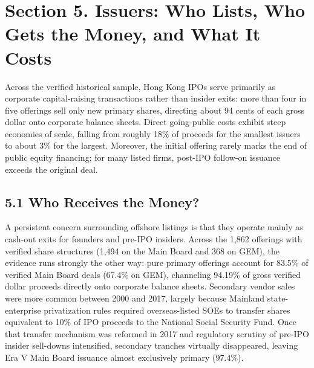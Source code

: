 \documentclass[11pt,letterpaper]{article}
\begin{document}
\section*{\texorpdfstring{Section 5. Issuers: Who Lists, Who Gets the Money, and What It Costs}{Section 5. Issuers: Who Lists, Who Gets the Money, and What It Costs}}
Across the verified historical sample, Hong Kong IPOs serve primarily as corporate capital-raising transactions rather than insider exits: more than four in five offerings sell only new primary shares, directing about 94 cents of each gross dollar onto corporate balance sheets. Direct going-public costs exhibit steep economies of scale, falling from roughly 18\% of proceeds for the smallest issuers to about 3\% for the largest. Moreover, the initial offering rarely marks the end of public equity financing; for many listed firms, post-IPO follow-on issuance exceeds the original deal.

\subsection*{\texorpdfstring{5.1 Who Receives the Money?}{5.1 Who Receives the Money?}}
A persistent concern surrounding offshore listings is that they operate mainly as cash-out exits for founders and pre-IPO insiders. Across the 1,862 offerings with verified share structures (1,494 on the Main Board and 368 on GEM), the evidence runs strongly the other way: pure primary offerings account for 83.5\% of verified Main Board deals (67.4\% on GEM), channeling 94.19\% of gross verified dollar proceeds directly onto corporate balance sheets. Secondary vendor sales were more common between 2000 and 2017, largely because Mainland state-enterprise privatization rules required overseas-listed SOEs to transfer shares equivalent to 10\% of IPO proceeds to the National Social Security Fund. Once that transfer mechanism was reformed in 2017 and regulatory scrutiny of pre-IPO insider sell-downs intensified, secondary tranches virtually disappeared, leaving Era V Main Board issuance almost exclusively primary (97.4\%).
\end{document}
